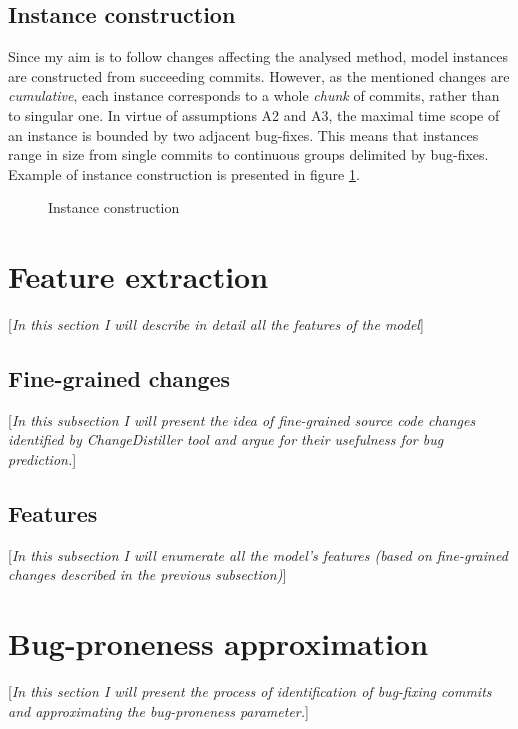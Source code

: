 \documentclass{pracamgr}
\begin{document}
\subsection{Instance construction}
\label{sec:instance_construction}

Since my aim is to follow changes affecting the analysed method, model instances are constructed from succeeding commits. However, as the mentioned changes are \emph{cumulative}, each instance corresponds to a whole \emph{chunk} of commits, rather than to singular one. In virtue of assumptions A2 and A3, the maximal time scope of an instance is bounded by two adjacent bug-fixes. This means that instances range in size from single commits to continuous groups delimited by bug-fixes. Example of instance construction is presented in figure \ref{fig:instance_construction}.

\begin{figure}[h]
\centering

\caption{Instance construction}
\label{fig:instance_construction}
\end{figure}

\section{Feature extraction}
\label{sec:feature_extraction}
[\textit{In this section I will describe in detail all the features of the model}]

\subsection{Fine-grained changes}
\label{sec:fine-grained_changes}
[\textit{In this subsection I will present the idea of fine-grained source code changes identified by ChangeDistiller tool and argue for their usefulness for bug prediction.}]

\subsection{Features}
\label{sec:features}
[\textit{In this subsection I will enumerate all the model's features (based on fine-grained changes described in the previous subsection)}]

\section{Bug-proneness approximation}
\label{sec:bug-proneness}
[\textit{In this section I will present the process of identification of bug-fixing commits and approximating the bug-proneness parameter.}]
\end{document}
